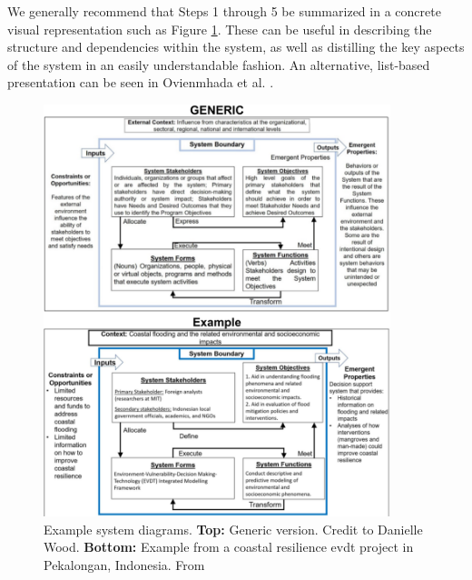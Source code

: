 We generally recommend that Steps 1 through 5 be summarized in a concrete visual representation such as Figure \ref{fig:system-diagram}. These can be useful in describing the structure and dependencies within the system, as well as distilling the key aspects of the system in an easily understandable fashion. An alternative, list-based presentation can be seen in Ovienmhada et al. \cite{ovienmhadaInclusiveDesignEarth2021}.

\begin{figure}[!htb] 
\centering
\includegraphics[width=0.9\textwidth]{Figures/chap3/system-diagram-combined.png}
\caption[Example system diagrams]{Example system diagrams. \textbf{Top:} Generic version. Credit to Danielle Wood. \textbf{Bottom:} Example from a coastal resilience \ac{evdt} project in Pekalongan, Indonesia. From \cite{lombardoEnvironmentVulnerabilityDecisionTechnologyFrameworkDecision2022}}
\label{fig:system-diagram}
\end{figure}





